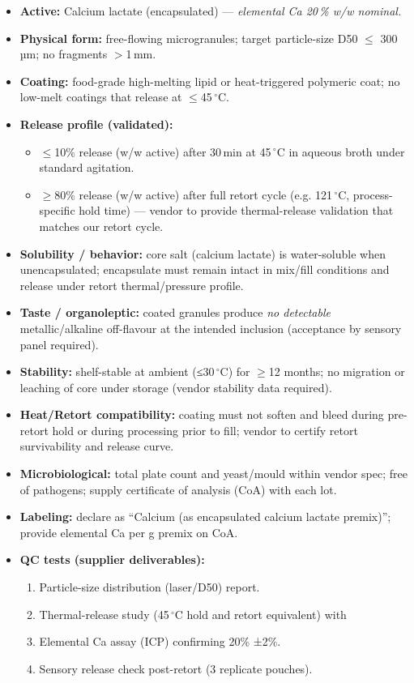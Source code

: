 \begin{itemize}
  \item \textbf{Active:} Calcium lactate (encapsulated) — \textit{elemental Ca 20\,\% w/w nominal.}
  \item \textbf{Physical form:} free-flowing microgranules; target particle-size D50 \(\leq\) 300\,µm; no fragments \(>\)1\,mm.
  \item \textbf{Coating:} food-grade high-melting lipid or heat-triggered polymeric coat; no low-melt coatings that release at \(\leq\)45\,\(^\circ\)C.
  \item \textbf{Release profile (validated):}
    \begin{itemize}
      \item \(\leq\)10\% release (w/w active) after 30\,min at 45\,\(^\circ\)C in aqueous broth under standard agitation.
      \item \(\geq\)80\% release (w/w active) after full retort cycle (e.g. 121\,\(^\circ\)C, process-specific hold time) — vendor to provide thermal-release validation that matches our retort cycle.
    \end{itemize}
  \item \textbf{Solubility / behavior:} core salt (calcium lactate) is water-soluble when unencapsulated; encapsulate must remain intact in mix/fill conditions and release under retort thermal/pressure profile.
  \item \textbf{Taste / organoleptic:} coated granules produce \textit{no detectable} metallic/alkaline off-flavour at the intended inclusion (acceptance by sensory panel required).
  \item \textbf{Stability:} shelf-stable at ambient (≤30\,\(^\circ\)C) for \(\geq\)12 months; no migration or leaching of core under storage (vendor stability data required).
  \item \textbf{Heat/Retort compatibility:} coating must not soften and bleed during pre-retort hold or during processing prior to fill; vendor to certify retort survivability and release curve.
  \item \textbf{Microbiological:} total plate count and yeast/mould within vendor spec; free of pathogens; supply certificate of analysis (CoA) with each lot.
  \item \textbf{Labeling:} declare as ``Calcium (as encapsulated calcium lactate premix)''; provide elemental Ca per g premix on CoA.
  \item \textbf{QC tests (supplier deliverables):}
    \begin{enumerate}
      \item Particle-size distribution (laser/D50) report.
      \item Thermal-release study (45\,\(^\circ\)C hold and retort equivalent) with %
      \item Elemental Ca assay (ICP) confirming 20\% ±2\%.
      \item Sensory release check post-retort (3 replicate pouches).
    \end{enumerate}
\end{itemize}


